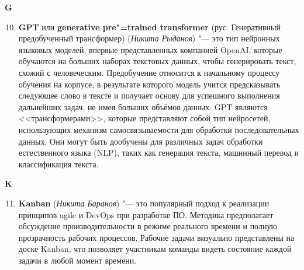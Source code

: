 \begin{flushleft} \large\textbf{G} \end{flushleft}

\begin{enumerate}
    \setcounter{enumi}{9}
    
    \item \textbf{GPT} или \textbf{generative pre"=trained transformer} (рус. Генеративный предобученный трансформер) (\textit{Никита Рыданов}) "--- это тип нейронных языковых моделей, впервые представленных компанией OpenAI, которые обучаются на больших наборах текстовых данных, чтобы генерировать текст, схожий с человеческим. Предобучение относится к начальному процессу обучения на корпусе, в результате которого модель учится предсказывать следующее слово в тексте и получает основу для успешного выполнения дальнейших задач, не имея больших объёмов данных. GPT являются <<трансформерами>>, которые представляют собой тип нейросетей, использующих механизм самосвязываемости для обработки последовательных данных. Они могут быть дообучены для различных задач обработки естественного языка (NLP), таких как генерация текста, машинный перевод и классификация текста.
    
\end{enumerate}

\begin{flushleft} \large\textbf{K} \end{flushleft}

\begin{enumerate}
    \setcounter{enumi}{10}
    
    \item \textbf{Kanban} (\textit{Никита Баранов}) "--- 
    это популярный подход к реализации принципов agile и DevOps при разработке ПО. Методика предполагает обсуждение производительности в режиме реального времени и полную прозрачность рабочих процессов. Рабочие задачи визуально представлены на доске Kanban, что позволяет участникам команды видеть состояние каждой задачи в любой момент времени.
    
\end{enumerate}

